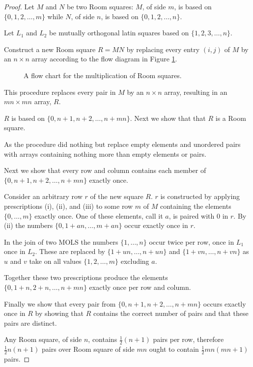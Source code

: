 \begin{proof}
Let $M$ and $N$ be two Room squares: $M$, of side $m$, is based on $\{0, 1, 2, \ldots, m\}$ while $N$, of side $n$, is based on $\{0, 1, 2, \ldots, n\}$.

Let $L_1$ and $L_2$ be mutually orthogonal latin squares based on $\{1, 2, 3, \ldots, n\}$.

Construct a new Room square $R = MN$ by replacing every entry $(i, j)$ of $M$ by an $n \times n$ array according to the flow diagram in Figure \ref{fig:flow}. 

\begin{figure}
  \centering
  
  \caption{A flow chart for the multiplication of Room squares.}
  \label{fig:flow}
\end{figure}

This procedure replaces every pair in $M$ by an $n \times n$ array, resulting in an $mn \times mn$ array, $R$.

$R$ is based on $\{0, n + 1, n + 2, \ldots, n + mn\}$.
Next we show that that $R$ is a Room square.

As the procedure did nothing but replace empty elements and unordered pairs with arrays containing nothing more than empty elements or pairs.

Next we show that every row and column contains each member of $\{0, n + 1, n + 2, \ldots, n + mn\}$ exactly once.

Consider an arbitrary row $r$ of the new square $R$.
$r$ is constructed by applying prescriptions (i), (ii), and (iii) to some row $m$ of $M$ containing the elements $\{0, \ldots, m\}$ exactly once.
One of these elements, call it $a$, is paired with 0 in $r$.
By (ii) the numbers $\{0, 1 + an, \ldots, m + an\}$ occur exactly once in $r$.

In the join of two MOLS the numbers $\{1, \ldots, n\}$ occur twice per row, once in $L_{1}$ once in $L_{2}$.
These are replaced by $\{1 + un, \ldots, n + un\}$ and $\{1 + vn, \ldots, n + vn\}$ as $u$ and $v$ take on all values $\{1, 2, \ldots, m\}$ excluding $a$.

Together these two prescriptions produce the elements $\{0, 1 + n, 2 + n, \ldots, n + mn\}$ exactly once per row and column.

Finally we show that every pair from $\{0, n + 1, n + 2, \ldots, n + mn\}$ occurs exactly once in $R$ by showing that $R$ contains the correct number of pairs and that these pairs are distinct.

Any Room square, of side $n$, contains $\frac{1}{2}(n + 1)$ pairs per row, therefore $\frac{1}{2}n(n + 1)$ pairs over Room square of side $mn$ ought to contain $\frac{1}{2}mn(mn + 1)$ pairs.


\end{proof}
